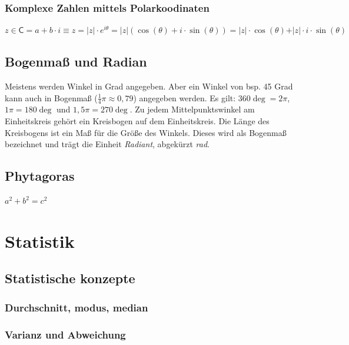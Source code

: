 \documentclass[letterpaper, titlepage]{article}
\begin{document}
\subsubsection{Komplexe Zahlen mittels Polarkoodinaten}
$z \in \mathsf{C} = a + b\cdot i \equiv z = \vert z \vert \cdot e^{i\theta} = \vert z \vert (\cos(\theta) + i \cdot \sin(\theta)) = \vert z \vert \cdot \cos(\theta) + \vert z \vert \cdot i \cdot \sin(\theta)$

\subsection{Bogenmaß und Radian}\label{Bogenmaß und Radian}
Meistens werden Winkel in Grad angegeben. Aber ein Winkel von  bsp. 45 Grad kann auch in Bogenmaß ($\frac{1}{4}\pi \approx 0,79$) angegeben werden. Es gilt: $360\deg = 2\pi$, $1\pi = 180\deg$ und $1,5\pi = 270\deg$. Zu jedem Mittelpunktswinkel am Einheitskreis gehört ein Kreisbogen auf dem Einheitskreis. Die Länge des Kreisbogens ist ein Maß für die Größe des Winkels. Dieses wird als Bogenmaß bezeichnet und trägt die Einheit \textit{Radiant}, abgekürzt \textit{rad}. 
\begin{center}
\end{center}
\subsection{Phytagoras}\label{Phytagoras}
$a^2+b^2=c^2$


\section{Statistik}\label{Statistik}


\subsection{Statistische konzepte}\label{Statistische konzepte}

\subsubsection{Durchschnitt, modus, median}\label{Durchschnitt, modus, median}

\subsubsection{Varianz und Abweichung}\label{Varianz und Abweichung}
\end{document}

